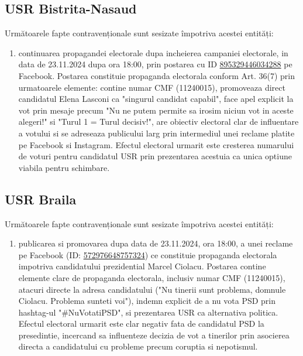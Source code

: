 \documentclass[a4paper,12pt]{article}
\begin{document}
\vspace{0.5cm}

\subsection{USR Bistrita-Nasaud}
Următoarele fapte contravenționale sunt sesizate împotriva acestei entități:

\begin{enumerate}[leftmargin=*, label=\arabic*.)]
    \item continuarea propagandei electorale dupa incheierea campaniei electorale, in data de 23.11.2024 dupa ora 18:00, prin postarea cu ID \href{https://www.facebook.com/ads/library/?id=895329446034288}{895329446034288} pe Facebook. Postarea constituie propaganda electorala conform Art. 36(7) prin urmatoarele elemente: contine numar CMF (11240015), promoveaza direct candidatul Elena Lasconi ca "singurul candidat capabil", face apel explicit la vot prin mesaje precum "Nu ne putem permite sa irosim niciun vot in aceste alegeri!" si "Turul 1 = Turul decisiv!", are obiectiv electoral clar de influentare a votului si se adreseaza publicului larg prin intermediul unei reclame platite pe Facebook si Instagram. Efectul electoral urmarit este cresterea numarului de voturi pentru candidatul USR prin prezentarea acestuia ca unica optiune viabila pentru schimbare.
\end{enumerate}

\vspace{0.5cm}

\subsection{USR Braila}
Următoarele fapte contravenționale sunt sesizate împotriva acestei entități:

\begin{enumerate}[leftmargin=*, label=\arabic*.)]
    \item publicarea si promovarea dupa data de 23.11.2024, ora 18:00, a unei reclame pe Facebook (ID: \href{https://www.facebook.com/ads/library/?id=572976648757324}{572976648757324}) ce constituie propaganda electorala impotriva candidatului prezidential Marcel Ciolacu. Postarea contine elemente clare de propaganda electorala, inclusiv numar CMF (11240015), atacuri directe la adresa candidatului ("Nu tinerii sunt problema, domnule Ciolacu. Problema sunteti voi"), indemn explicit de a nu vota PSD prin hashtag-ul "\#NuVotatiPSD", si prezentarea USR ca alternativa politica. Efectul electoral urmarit este clar negativ fata de candidatul PSD la presedintie, incercand sa influenteze decizia de vot a tinerilor prin asocierea directa a candidatului cu probleme precum coruptia si nepotismul.
\end{enumerate}
\end{document}
